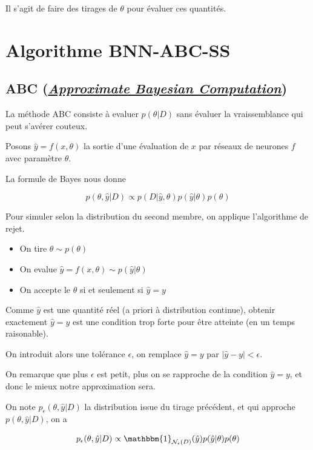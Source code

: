 \documentclass[french,12pt]{article}
\begin{document}
Il s'agit de faire des tirages de $\theta$ pour évaluer ces quantités.

\pagebreak

\section{Algorithme BNN-ABC-SS}

\subsection{ABC (\href{https://en.wikipedia.org/wiki/Approximate_Bayesian_computation}{\textit{Approximate Bayesian Computation}})}

La méthode ABC consiste à evaluer $p(\theta | D)$ sans évaluer
la vraissemblance qui peut s'avérer couteux.

Posons $\hat{y} = f(x, \theta)$ la sortie d'une évaluation de $x$ par
réseaux de neurones $f$ avec paramètre $\theta$.

La formule de Bayes nous donne

$$ p(\theta, \hat{y} | D) \propto p(D | \hat{y}, \theta) p(\hat{y} | \theta)
    p(\theta)$$

Pour simuler selon la distribution du second membre, on applique
l'algorithme de rejet.

\begin{itemize}
    \item On tire $\theta \sim p(\theta)$
    \item On evalue $\hat{y} = f(x , \theta) \sim p(\hat{y} | \theta)$
    \item On accepte le $\theta$ si et seulement si $\hat{y} = y$
\end{itemize}

Comme $\hat{y}$ est une quantité réel (a priori à distribution continue),
obtenir exactement $\hat{y} = y$ est une condition trop forte
pour être atteinte (en un temps raisonable).

On introduit alors une tolérance $\epsilon$, on remplace $\hat{y} = y$
par $|\hat{y} - y| < \epsilon$.

On remarque que plus $\epsilon$ est petit, plus on se rapproche de la condition $\hat{y} = y$,
et donc le mieux notre approximation sera.

On note $p_{\epsilon} (\theta, \hat{y} | D)$ la distribution issue
du tirage précédent, et qui approche $p(\theta, \hat{y} |D)$, on a

$$p_{\epsilon} (\theta , \hat{y} | D) \propto \mathbbm{1}_{\mathcal{N}_{\epsilon}(D)} (\hat{y}) p(\hat{y} | \theta)
    p(\theta) $$
\end{document}
